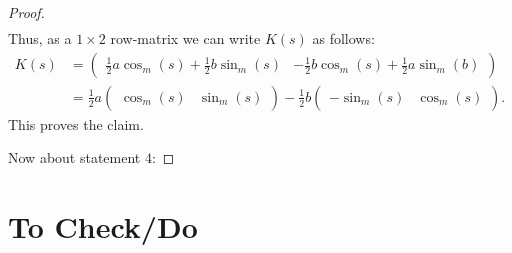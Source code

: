 \documentclass[12pt, a4paper]{article}
\theoremstyle{plain}
\theoremstyle{definition}
\theoremstyle{remark}
\begin{document}
\begin{proof}
\begin{align*}
\end{align*}
Thus, as a $1 \times 2$ row-matrix we can write $K(s)$ as follows:
\begin{align*}
K(s) & = \begin{pmatrix} \frac{1}{2} a \cos_m(s) + \frac{1}{2}b \sin_m(s) & - \frac{1}{2} b \cos_m(s) + \frac{1}{2} a \sin_m(b) \end{pmatrix} \\
& = \frac{1}{2} a \begin{pmatrix}  \cos_m(s) & \sin_m(s) \end{pmatrix} - \frac{1}{2} b \begin{pmatrix} - \sin_m(s) & \cos_m(s) \end{pmatrix}.
\end{align*}
This proves the claim.

Now about statement $4$:
\end{proof}





\section{To Check/Do}
\end{document}
